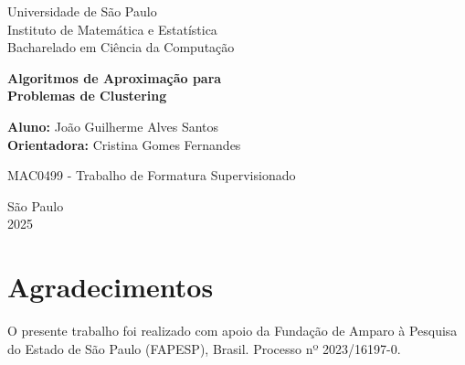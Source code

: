 \documentclass[12pt]{article}
\begin{document}
\begin{center}
{\large Universidade de São Paulo\\
Instituto de Matemática e Estatística\\
Bacharelado em Ciência da Computação}
    \vspace*{7cm}


{\Large {\bf Algoritmos de Aproximação para \\Problemas de Clustering}
}

\vspace{0.2cm}
{\small 
{\bf Aluno:} João Guilherme Alves Santos\\
{\bf Orientadora:} Cristina Gomes Fernandes
}
\vspace{3cm} 

{MAC0499 - Trabalho de Formatura Supervisionado}
\vspace{5cm}

{\small
São Paulo \\
2025
}
\end{center}


    
    
    
    


\newpage
\section*{Agradecimentos}
O presente trabalho foi realizado com apoio da Fundação de Amparo à Pesquisa do Estado de São Paulo (FAPESP), Brasil. Processo nº 2023/16197-0.
\newpage
\tableofcontents
\newpage
\end{document}
